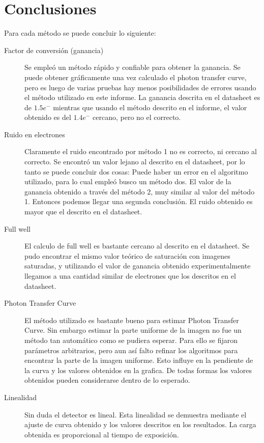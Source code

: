 \documentclass[a4paper,10pt]{article}
\begin{document}
\section{Conclusiones}
Para cada método se puede concluir lo siguiente:
\begin{description}
\item [Factor de conversión (ganancia)] Se empleó un método rápido y confiable
para obtener la ganancia. Se puede obtener gráficamente una vez calculado el
photon transfer curve, pero es luego de varias pruebas hay menos posibilidades
de errores usando el método utilizado en este informe. La ganancia descrita en
el datasheet es de $1.5 e^-$ mientras que usando el método descrito en el
informe, el valor obtenido es del $1.4 e^-$ cercano, pero no el correcto.


\item [Ruido en electrones] Claramente el ruido encontrado por método 1 no es
correcto, ni cercano al correcto. Se encontró un valor lejano al descrito en el
datasheet, por lo tanto se puede concluir dos cosas: Puede haber un error en el
algoritmo utilizado, para lo cual empleó busco un método dos. El valor de la
ganancia obtenido a través del método 2, muy similar al valor del método 1.
Entonces podemos llegar una segunda conclusión. El ruido obtenido es mayor que
el descrito en el datasheet.

\item [Full well] El calculo de full well es bastante cercano al descrito en el
datasheet. Se pudo encontrar el mismo valor teórico de saturación con imagenes
saturadas, y utilizando el valor de ganancia obtenido experimentalmente llegamos
a una cantidad similar de electrones que los descritos en el datasheet.

\item [Photon Transfer Curve] El método utilizado es bastante bueno para
estimar  Photon Transfer Curve. Sin embargo estimar la parte uniforme de la
imagen no fue un método tan automático como se pudiera esperar. Para ello se
fijaron parámetros arbitrarios, pero aun así falto refinar los algoritmos para
encontrar la parte de la imagen uniforme. Esto influye en la pendiente de la
curva y los valores obtenidos en la grafica. De todas formas los valores
obtenidos pueden considerarse dentro de lo esperado.

\item [Linealidad] Sin duda el detector es lineal. Esta linealidad se demuestra
mediante el ajuste de curva obtenido y los valores descritos en los resultados.
La carga obtenida es proporcional al tiempo de exposición.


\end{description}
\end{document}
